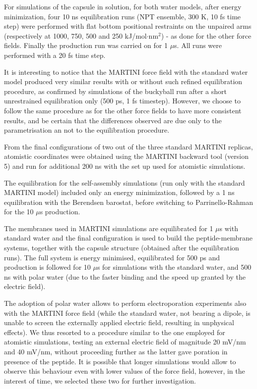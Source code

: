 For simulations of the capsule in solution, for both water models, after energy minimization, four 10 ns equilibration runs (NPT ensemble, 300 K, 10 fs time step) were performed with flat bottom positional restraints on the unpaired arms (respectively at 1000, 750, 500 and 250 kJ/mol$\cdot$nm$^2$) - as done for the other force fields.
%
Finally the production run was carried on for 1 $\mu$s. All runs were performed with a 20 fs time step.

It is interesting to notice that the MARTINI force field with the standard water model produced very similar results with or without such refined equilibration procedure, as confirmed by simulations of the buckyball run after a short unrestrained equilibration only (500 ps, 1 fs timestep). However, we choose to follow the same procedure as for the other force fields to have more consistent results, and be certain that the differences observed are due only to the parametrisation an not to the equilibration procedure.

From the final configurations of two out of the three standard MARTINI replicas, atomistic coordinates were obtained using the MARTINI backward tool (version 5) \citep{Wassenaar2014} and run for additional 200 ns with the set up used for atomistic simulations.

The equilibration for the self-assembly simulations (run only with the standard MARTINI model) included only an energy minimization, followed by a 1 ns equilibration with the Berendsen barostat, before switching to Parrinello-Rahman for the 10 $\mu$s production.

The membranes used in MARTINI simulations are equilibrated for 1 $\mu$s with standard water and the final configuration is used to build the peptide-membrane systems, together with the capsule structure (obtained after the equilibration runs). The full system is energy minimised, equilibrated for 500 ps and production is followed for 10 $\mu$s for simulations with the standard water, and 500 ns with polar water (due to the faster binding and the speed up granted by the electric field).

The adoption of polar water allows to perform electroporation experiments also with the MARTINI force field (while the standard water, not bearing a dipole, is unable to screen the externally applied electric field, resulting in unphysical effects).
%
We thus resorted to a procedure similar to the one employed for atomistic simulations, testing an external electric field of magnitude 20 mV/nm and 40 mV/nm, without proceeding further as the latter gave poration in presence of the peptide.
%
It is possible that longer simulations would allow to observe this behaviour even with lower values of the force field, however, in the interest of time, we selected these two for further investigation.

